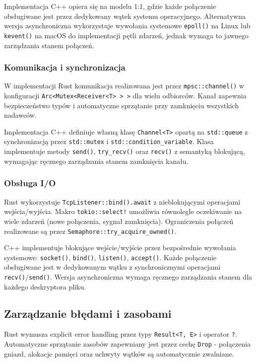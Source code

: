 Implementacja C++ opiera się na modelu 1:1, gdzie każde połączenie obsługiwane jest przez dedykowany wątek systemu operacyjnego. Alternatywna wersja asynchroniczna wykorzystuje wywołania systemowe \texttt{epoll()} na Linux lub \texttt{kevent()} na macOS do implementacji pętli zdarzeń, jednak wymaga to jawnego zarządzania stanem połączeń.

\subsubsection{Komunikacja i synchronizacja}

W implementacji Rust komunikacja realizowana jest przez \texttt{mpsc::channel()} w konfiguracji \texttt{Arc<Mutex<Receiver<T> > >} dla wielu odbiorców. Kanał zapewnia bezpieczeństwo typów i automatyczne sprzątanie przy zamknięciu wszystkich nadawców.

Implementacja C++ definiuje własną klasę \texttt{Channel<T>} opartą na \texttt{std::queue} z synchronizacją przez \texttt{std::mutex} i \texttt{std::condition\_variable}. Klasa implementuje metody \texttt{send()}, \texttt{try\_recv()} oraz \texttt{recv()} z semantyką blokującą, wymagając ręcznego zarządzania stanem zamknięcia kanału.

\subsubsection{Obsługa I/O}

Rust wykorzystuje \texttt{TcpListener::bind().await} z nieblokującymi operacjami wejścia/wyjścia. Makro \texttt{tokio::select!} umożliwia równoległe oczekiwanie na wiele zdarzeń (nowe połączenia, sygnał zamknięcia). Ograniczenia połączeń realizowane są przez \texttt{Semaphore::try\_acquire\_owned()}.

C++ implementuje blokujące wejście/wyjście przez bezpośrednie wywołania systemowe: \texttt{socket()}, \texttt{bind()}, \texttt{listen()}, \texttt{accept()}. Każde połączenie obsługiwane jest w dedykowanym wątku z synchronicznymi operacjami \texttt{recv()}/\texttt{send()}. Wersja asynchroniczna wymaga ręcznego zarządzania stanem dla każdego deskryptora pliku.

\subsection{Zarządzanie błędami i zasobami}

Rust wymusza explicit error handling przez typy \texttt{Result<T, E>} i operator \texttt{?}. Automatyczne sprzątanie zasobów zapewniany jest przez cechę \texttt{Drop} - połączenia gniazd, alokacje pamięci oraz uchwyty wątków są automatycznie zwalniane.

